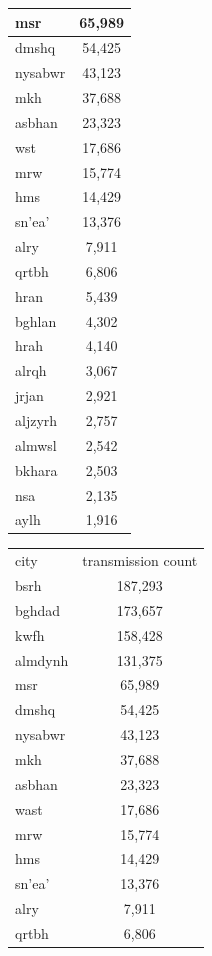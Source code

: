 \documentclass[12pt,english]{article}
\begin{document}
\begin{table}[H]
\begin{tabular}{|l|c|}
\hline
msr & 65,989 \\
\hline
dmshq & 54,425 \\
\hline
nysabwr & 43,123 \\
\hline
mkh & 37,688 \\
\hline
asbhan & 23,323 \\
\hline
wst & 17,686 \\
\hline
mrw & 15,774 \\
\hline
hms & 14,429 \\
\hline
sn'ea' & 13,376 \\
\hline
alry & 7,911 \\
\hline
qrtbh & 6,806 \\
\hline
hran & 5,439 \\
\hline
bghlan & 4,302 \\
\hline
hrah & 4,140 \\
\hline
alrqh & 3,067 \\
\hline
jrjan & 2,921 \\
\hline
aljzyrh & 2,757 \\
\hline
almwsl & 2,542 \\
\hline
bkhara & 2,503 \\
\hline
nsa & 2,135 \\
\hline
aylh & 1,916 \\
\hline
\end{tabular}
\quad
\begin{tabular}{|l|c|}
\hline
\multirow{2}{1cm}{city}&\multirow{2}{2.3cm}{\centering transmission count}\\
&\\
\hline
bsrh & 187,293 \\
\hline
bghdad & 173,657 \\
\hline
kwfh & 158,428 \\
\hline
almdynh & 131,375 \\
\hline
msr & 65,989 \\
\hline
dmshq & 54,425 \\
\hline
nysabwr & 43,123 \\
\hline
mkh & 37,688 \\
\hline
asbhan & 23,323 \\
\hline
wast & 17,686 \\
\hline
mrw & 15,774 \\
\hline
hms & 14,429 \\
\hline
sn'ea' & 13,376 \\
\hline
alry & 7,911 \\
\hline
qrtbh & 6,806 \\

\end{tabular}
\end{table}
\end{document}
